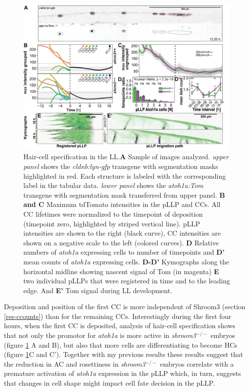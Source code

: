 \documentclass[10pt, b5paper, singlespacinge, twoside]{reedthesis} %
\theoremstyle{definition}
\theoremstyle{definition}
\theoremstyle{definition}
\theoremstyle{remark}
\begin{document}
\begin{figure}

{\centering \includegraphics[width=0.95\linewidth]{figures/results/05_atoh/ato-tom} 

}

\caption[Hair-cell specification in the LL]{Hair-cell specification in the LL.\textbf{A} Sample of images analyzed. \emph{upper panel} shows the \emph{cldnb:lyn-gfp} transgene with segmentation masks highlighted in red. Each structure is labeled with the corresponding label in the tabular data. \emph{lower panel} shows the \emph{atoh1a:Tom} transgene with segmentation mask transferred from upper panel. \textbf{B and C} Maximum tdTomato intensities in the pLLP and CCs. All CC lifetimes were normalized to the timepoint of deposition (timepoint zero, highlighted by striped vertical line). pLLP intensities are shown to the right (black curve), CC intensities are shown on a negative scale to the left (colored curves). \textbf{D} Relative numbers of \emph{atoh1a} expressing cells to number of timepoints and \textbf{D'} mean counts of \emph{atoh1a} expressing cells. \textbf{D-D'} Kymographs along the horizontal midline showing nascent signal of Tom (in magenta) \textbf{E} two individual pLLPs that were registered in time and to the leading edge. And \textbf{E'} Tom signal during LL development.}\label{fig:hctl}
\end{figure}
Deposition and position of the first CC is more independent of Shroom3 (section \ref{res-ccounts}) than for the remaining CCs. Interestingly during the first four hours, when the first CC is deposited, analysis of hair-cell specification shows that not only the promotor for \emph{atoh1a} is more active in \emph{shroom3}\(^{-/-}\) embryos (figure \ref{fig:hctl} A and B), but also that more cells are differentiating to become HCs (figure \ref{fig:hctl}C and C'). Together with my previous results these results suggest that the reduction in AC and rosettiness in \emph{shroom3}\(^{-/-}\) embryos correlate with a premature activation of \emph{atoh1a} expression in the pLLP which, in turn, suggests that changes in cell shape might impact cell fate decision in the pLLP.
\end{document}
